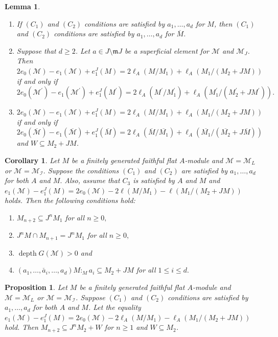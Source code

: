 \documentclass[10pt,a4paper]{amsart}
\newtheorem{lemma}{Lemma}
\newtheorem{corollary}{Corollary}
\newtheorem{proposition}{Proposition}
\def\I{{\mathcal I}}
\def\M{{\mathcal M}}
\DeclareMathOperator{\depth}{depth}
\newcommand{\m}{\mathfrak m}
\begin{document}
\begin{lemma}\label{lemma-reduction-steps}
	\begin{enumerate}[label=(\roman*)]
		\item  If $(C_1)$ and $(C_2)$ conditions are satisfied by $a_1,\ldots,a_d$ for $M$, then $(C_1)$ and $(C_2)$ conditions are satisfied by $a_1,\ldots,a_d$ for $\overline{M}$. 
		
		\item \label{lemma-4.1} Suppose that $d\geq 2$. Let $a\in J\setminus \m J$ be a superficial element for $\M$ and $\M_J$.  Then  $2e_0(\M)-e_1(\M)+e_1^J(M)=2\ell_A(M/M_1)+\ell_A(M_1/(M_2+JM))$ if and only if
		$2e_0(\M^\prime)-e_1(\M^\prime)+e_1^J(M^\prime)=2\ell_{A}(M^\prime/{M}^\prime_1)+\ell_{A}({M}^\prime_1/({M}^\prime_2+JM^\prime)).$
		
		\item \label{lemma-4.2} $2e_0(\M)-e_1(\M)+e_1^J(M)=2\ell_A(M/M_1)+\ell_A(M_1/(M_2+JM))$ if and only if  
		$2e_0(\overline{\M})-e_1(\overline{\M})+e_1^J(\overline{M})=2\ell_A(\overline{M}/\overline{M_1} )+\ell_A(\overline{M_1} /(\overline{M_2} +J\overline{M}))$ and $W\subseteq M_2+JM$.
	\end{enumerate}
\end{lemma}

\begin{corollary}\label{corollary-3.6} Let $M$ be a finitely generated faithful flat $A$-module and $\M=\M_L$ or $\M=\M_\I.$ Suppose the conditions $(C_1)$ and $(C_2)$  are satisfied by $a_1,\ldots,a_d$ for both $A$ and $M.$ Also, assume that $C_3$ is satisfied by $A$ and $M$ and  $e_1(\M)-e_1^J(M)=2e_0(\M)-2\ell(M/M_1)-\ell(M_1/(M_2+JM))$ holds. Then the following conditions hold:
	\begin{enumerate}[label=(\roman*)]
		\item $M_{n+2}\subseteq J^n M_1$ for all $n\geq 0, $
		\item $J^nM\cap M_{n+1}=J^n M_1$ for all $n\geq 0,$
		\item $\depth G(\mathcal{\M})>0$ and 
		\item $(a_1,\ldots,\check{a_i},\ldots,a_d)M:_Ma_i\subseteq M_2+JM$ for all $1\leq i\leq d.$
	\end{enumerate}
\end{corollary}

\begin{proposition}\label{theorem-4.3}
 Let $M$ be a finitely generated faithful flat $A$-module and $\M=\M_L$ or $\M=\M_\I$. Suppose $(C_1)$ and $(C_2)$ conditions are satisfied by $a_1,\ldots,a_d$ for both $A$ and $M$.  Let the equality
	$e_1(\M)-e_1^J(M)=2e_0(\M)-2\ell_A(M/M_1)-\ell_A(M_1/(M_2+JM))$ hold. Then $M_{n+2}\subseteq J^nM_2+W$ for $n\geq 1$ and $W\subseteq M_2$.
\end{proposition}
\end{document}
